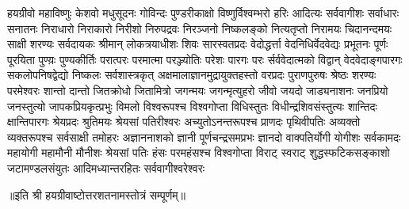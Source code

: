 
\twolineshloka
{हयग्रीवो महाविष्णुः केशवो मधुसूदनः}
{गोविन्दः पुण्डरीकाक्षो विष्णुर्विश्वम्भरो हरिः}
\twolineshloka
{आदित्यः सर्ववागीशः सर्वाधारः सनातनः}
{निराधारो निराकारो निरीशो निरुपद्रवः}
\twolineshloka
{निरञ्जनो  निष्कलङ्को नित्यतृप्तो निरामयः}
{चिदानन्दमयः साक्षी शरण्यः सर्वदायकः}
\twolineshloka
{श्रीमान् लोकत्रयाधीशः शिवः सारस्वतप्रदः}
{वेदोद्धर्त्ता वेदनिधिर्वेदवेद्यः प्रभूतनः}
\twolineshloka
{पूर्णः पूरयिता पुण्य़ः पुण्यकीर्तिः परात्परः}
{परमात्मा परञ्ज्योतिः परेशः पारगः परः}
\twolineshloka
{र्सर्ववेदात्मको विद्वान् वेदवेदाङ्गपारगः}
{सकलोपनिषद्वेद्यो निष्कलः सर्वशास्त्रकृत्}
\twolineshloka
{अक्षमालाज्ञानमुद्रायुक्तहस्तो वरप्रदः}
{पुराणपुरुषः श्रेष्ठः शरण्यः परमेश्वरः }
\twolineshloka
{शान्तो दान्तो जितक्रोधो जितामित्रो जगन्मयः}
{जगन्मृत्युहरो जीवो जयदो जाड्यनाशनः}
\twolineshloka
{जनप्रियो जनस्तुत्यो जापकप्रियकृत्प्रभुः}
{विमलो विश्वरूपश्च विश्वगोप्ता विधिस्तुतः}
\twolineshloka
{विधीन्द्रशिवसंस्तुत्यः शान्तिदः क्षान्तिपारगः}
{श्रेयप्रदः श्रुतिमयः श्रेयसां पतिरीश्वरः}
\twolineshloka
{अच्युतोऽनन्तरूपश्च प्राणदः पृथिवीपतिः}
{अव्यक्तो व्यक्तरूपश्च सर्वसाक्षी तमोहरः}
\twolineshloka
{अज्ञाननाशको ज्ञानी पूर्णचन्द्रसमप्रभः}
{ज्ञानदो वाक्पतिर्योगी योगीशः सर्वकामदः}
\twolineshloka
{महायोगी महामौनी मौनीशः श्रेयसां पतिः}
{हंसः परमहंसश्च विश्वगोप्ता विराट् स्वराट्}
\twolineshloka
{शुद्धस्फटिकसङ्काशो जटामण्डलसंयुतः}
{आदिमध्यान्तरहितः सर्ववागीश्वरेश्वरः}

॥इति श्री हयग्रीवाष्टोत्तरशतनामस्तोत्रं सम्पूर्णम्॥
